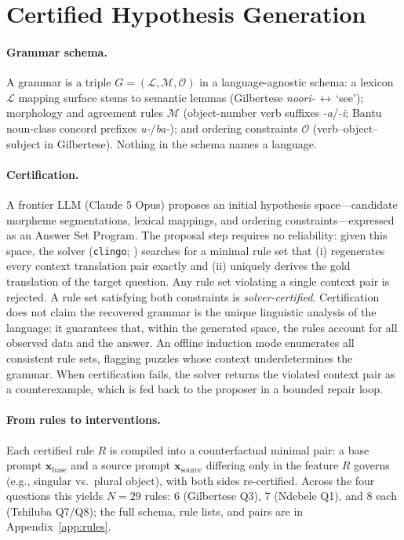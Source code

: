 \section{Certified Hypothesis Generation}
\label{sec:generation}

\paragraph{Grammar schema.} A grammar is a triple
$G = (\mathcal{L}, \mathcal{M}, \mathcal{O})$ in a language-agnostic
schema: a lexicon $\mathcal{L}$ mapping surface stems to semantic lemmas
(Gilbertese \emph{noori-}\,$\leftrightarrow$\,`see'); morphology and
agreement rules $\mathcal{M}$ (object-number verb suffixes \emph{-a}/\emph{-i};
Bantu noun-class concord prefixes \emph{u-}/\emph{ba-}); and ordering
constraints $\mathcal{O}$ (verb--object--subject in Gilbertese). Nothing in
the schema names a language.

\paragraph{Certification.} A frontier LLM (Claude 5 Opus) proposes an
initial hypothesis space---candidate morpheme segmentations, lexical
mappings, and ordering constraints---expressed as an Answer Set Program.
The proposal step requires no reliability: given this space, the solver
(\texttt{clingo}; \citealp{gebser2014}) searches for a minimal rule set
that (i) regenerates every context translation pair exactly and (ii)
uniquely derives the gold translation of the target question. Any rule set
violating a single context pair is rejected. A rule set satisfying both
constraints is \emph{solver-certified}. Certification does not claim the
recovered grammar is the unique linguistic analysis of the language; it
guarantees that, within the generated space, the rules account for all
observed data and the answer. An offline induction mode enumerates all
consistent rule sets, flagging puzzles whose context underdetermines the
grammar. When certification fails, the solver returns the violated context
pair as a counterexample, which is fed back to the proposer in a bounded
repair loop. 

\paragraph{From rules to interventions.} Each certified rule $R$ is
compiled into a counterfactual minimal pair: a base prompt
$\mathbf{x}_{\text{base}}$ and a source prompt $\mathbf{x}_{\text{source}}$
differing only in the feature $R$ governs (e.g., singular vs.\ plural
object), with both sides re-certified. Across the four questions this
yields $N{=}29$ rules: 6 (Gilbertese Q3), 7 (Ndebele Q1), and 8 each
(Tshiluba Q7/Q8); the full schema, rule lists, and pairs are in
Appendix~\ref{app:rules}.
